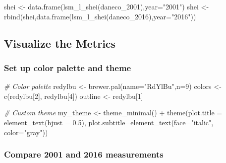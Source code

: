 \documentclass[
]{article}
\newenvironment{Shaded}{\begin{snugshade}}{\end{snugshade}}
\newcommand{\AttributeTok}[1]{\textcolor[rgb]{0.77,0.63,0.00}{#1}}
\newcommand{\CommentTok}[1]{\textcolor[rgb]{0.56,0.35,0.01}{\textit{#1}}}
\newcommand{\DecValTok}[1]{\textcolor[rgb]{0.00,0.00,0.81}{#1}}
\newcommand{\FloatTok}[1]{\textcolor[rgb]{0.00,0.00,0.81}{#1}}
\newcommand{\FunctionTok}[1]{\textcolor[rgb]{0.00,0.00,0.00}{#1}}
\newcommand{\NormalTok}[1]{#1}
\newcommand{\OtherTok}[1]{\textcolor[rgb]{0.56,0.35,0.01}{#1}}
\newcommand{\SpecialCharTok}[1]{\textcolor[rgb]{0.00,0.00,0.00}{#1}}
\newcommand{\StringTok}[1]{\textcolor[rgb]{0.31,0.60,0.02}{#1}}
\begin{document}
\begin{Shaded}
\begin{Highlighting}[]
\NormalTok{shei }\OtherTok{\textless{}{-}} \FunctionTok{data.frame}\NormalTok{(}\FunctionTok{lsm\_l\_shei}\NormalTok{(daneco\_2001),}\AttributeTok{year=}\StringTok{"2001"}\NormalTok{)}
\NormalTok{shei }\OtherTok{\textless{}{-}} \FunctionTok{rbind}\NormalTok{(shei,}\FunctionTok{data.frame}\NormalTok{(}\FunctionTok{lsm\_l\_shei}\NormalTok{(daneco\_2016),}\AttributeTok{year=}\StringTok{"2016"}\NormalTok{))}
\end{Highlighting}
\end{Shaded}

\hypertarget{visualize-the-metrics}{%
\subsection{Visualize the Metrics}\label{visualize-the-metrics}}

\hypertarget{set-up-color-palette-and-theme}{%
\subsubsection{Set up color palette and
theme}\label{set-up-color-palette-and-theme}}

\begin{Shaded}
\begin{Highlighting}[]
\CommentTok{\# Color palette}
\NormalTok{redylbu }\OtherTok{\textless{}{-}} \FunctionTok{brewer.pal}\NormalTok{(}\AttributeTok{name=}\StringTok{"RdYlBu"}\NormalTok{,}\AttributeTok{n=}\DecValTok{9}\NormalTok{)}
\NormalTok{colors }\OtherTok{\textless{}{-}} \FunctionTok{c}\NormalTok{(redylbu[}\DecValTok{2}\NormalTok{], redylbu[}\DecValTok{4}\NormalTok{])}
\NormalTok{outline }\OtherTok{\textless{}{-}}\NormalTok{ redylbu[}\DecValTok{1}\NormalTok{]}

\CommentTok{\# Custom theme}
\NormalTok{my\_theme }\OtherTok{\textless{}{-}} \FunctionTok{theme\_minimal}\NormalTok{() }\SpecialCharTok{+}
  \FunctionTok{theme}\NormalTok{(}\AttributeTok{plot.title =} \FunctionTok{element\_text}\NormalTok{(}\AttributeTok{hjust =} \FloatTok{0.5}\NormalTok{),}
        \AttributeTok{plot.subtitle=}\FunctionTok{element\_text}\NormalTok{(}\AttributeTok{face=}\StringTok{"italic"}\NormalTok{, }\AttributeTok{color=}\StringTok{"gray"}\NormalTok{))}
\end{Highlighting}
\end{Shaded}

\hypertarget{compare-2001-and-2016-measurements}{%
\subsubsection{Compare 2001 and 2016
measurements}\label{compare-2001-and-2016-measurements}}
\end{document}
